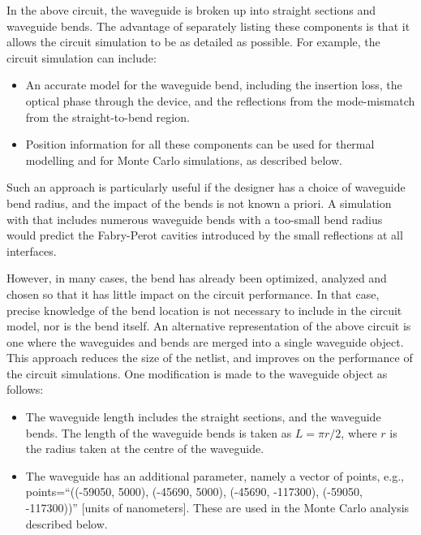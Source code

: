 \documentclass[journal]{spie}
\begin{document}
In the above circuit, the waveguide is broken up into straight sections and waveguide bends.  The advantage of separately listing these components is that it allows the circuit simulation to be as detailed as possible.  For example, the circuit simulation can include:
\begin{itemize}
\item An accurate model for the waveguide bend, including the insertion loss, the optical phase through the device, and the reflections from the mode-mismatch from the straight-to-bend region.
\item Position information for all these components can be used for thermal modelling and for Monte Carlo simulations, as described below.
\end{itemize}
Such an approach is particularly useful if the designer has a choice of waveguide bend radius, and the impact of the bends is not known a priori.  A simulation with that includes numerous waveguide bends with a too-small bend radius would predict the Fabry-Perot cavities introduced by the small reflections at all interfaces.  

However, in many cases, the bend has already been optimized, analyzed and chosen so that it has little impact on the circuit performance.  In that case, precise knowledge of the bend location is not necessary to include in the circuit model, nor is the bend itself.  An alternative representation of the above circuit is one where the waveguides and bends are merged into a single waveguide object.  This approach reduces the size of the netlist, and improves on the performance of the circuit simulations.  One modification is made to the waveguide object as follows:
\begin{itemize}
\item The waveguide length includes the straight sections, and the waveguide bends.  The length of the waveguide bends is taken as $L = \pi r/2$, where $r$ is the radius taken at the centre of the waveguide.
\item The waveguide has an additional parameter, namely a vector of points, e.g., points=``((-59050, 5000), (-45690, 5000), (-45690, -117300), (-59050, -117300))''  [units of nanometers].  These are used in the Monte Carlo analysis described below.
\end{itemize}
\end{document}
